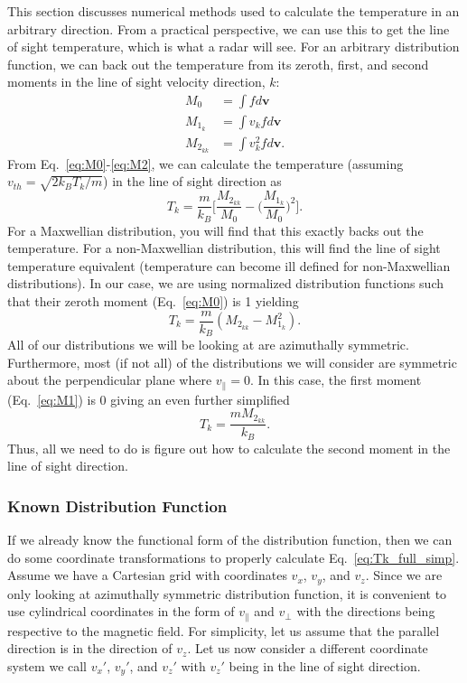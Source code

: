 This section discusses numerical methods used to calculate the temperature in an arbitrary direction.
From a practical perspective, we can use this to get the line of sight temperature, which is what a radar will see.
For an arbitrary distribution function, we can back out the temperature from its zeroth, first, and second moments in the line of sight velocity direction, $k$:
\begin{align}
	M_0 &= \int f d\mathbf{v} \label{eq:M0}\\
	M_{1_k} &= \int v_k f d\mathbf{v} \label{eq:M1} \\
	M_{2_{kk}} &= \int v_k^2 f d\mathbf{v}. \label{eq:M2}
\end{align}
From Eq.~\ref{eq:M0}-\ref{eq:M2}, we can calculate the temperature (assuming $v_{th}=\sqrt{2k_BT_k/m}$) in the line of sight direction as
\begin{equation}
	T_k = \frac{m}{k_B} \Bigg[ \frac{M_{2_{kk}}}{M_0}  - \bigg( \frac{M_{1_k}}{M_0} \bigg)^2\Bigg].
	\label{eq:Tk_full}
\end{equation}
For a Maxwellian distribution, you will find that this exactly backs out the temperature.
For a non-Maxwellian distribution, this will find the line of sight temperature equivalent (temperature can become ill defined for non-Maxwellian distributions).
In our case, we are using normalized distribution functions such that their zeroth moment (Eq.~\ref{eq:M0}) is 1 yielding
\begin{equation}
	T_k = \frac{m}{k_B} (M_{2_{kk}} - M_{1_k}^2).
	\label{eq:Tk_simp}
\end{equation}
All of our distributions we will be looking at are azimuthally symmetric. 
Furthermore, most (if not all) of the distributions we will consider are symmetric about the perpendicular plane where $v_\parallel=0$.
In this case, the first moment (Eq.~\ref{eq:M1}) is 0 giving an even further simplified 
\begin{equation}
	T_k = \frac{m M_{2_{kk}}}{k_B}.
	\label{eq:Tk_full_simp}
\end{equation}
Thus, all we need to do is figure out how to calculate the second moment in the line of sight direction.

\subsubsection{Known Distribution Function}
If we already know the functional form of the distribution function, then we can do some coordinate transformations to properly calculate Eq.~\ref{eq:Tk_full_simp}. 
Assume we have a Cartesian grid with coordinates $v_x$, $v_y$, and $v_z$.  %
Since we are only looking at azimuthally symmetric distribution function, it is convenient to use cylindrical coordinates in the form of $v_\parallel$ and $v_\perp$ with the directions being respective to the magnetic field.
For simplicity, let us assume that the parallel direction is in the direction of $v_z$.
Let us now consider a different coordinate system we call $v_x'$, $v_y'$, and $v_z'$ with $v_z'$ being in the line of sight direction.


